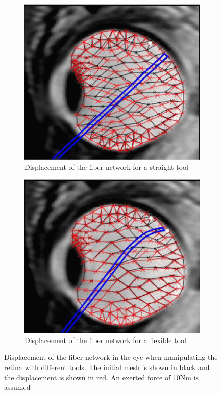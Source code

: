 \begin{figure}[H]
    \centering
    \begin{subfigure}[b]{0.3\textwidth}
        \includegraphics[width=\textwidth]{Figures/displacement_stiff.png}
        \caption{Displacement of the fiber network for a straight tool}
        \label{fig:displacement_stiff}
    \end{subfigure}
    \qquad \qquad
    \begin{subfigure}[b]{0.3\textwidth}
        \includegraphics[width=\textwidth]{Figures/displacement_flex.png}
        \caption{Displacement of the fiber network for a flexible tool}
        \label{fig:dispalcement_flex}
    \end{subfigure}
    \caption{Displacement of the fiber network in the eye when manipulating the retina with different tools. The initial mesh is shown in black and the displacement is shown in red. An exerted force of 10Nm is assumed \cite{flexibleRetina}}
    \label{fig:displacement}
\end{figure}
